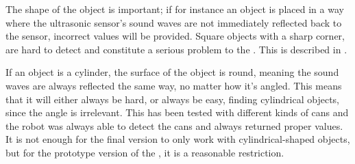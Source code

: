 The shape of the object is important; if for instance an object is placed in a way where the ultrasonic sensor's sound waves are not immediately reflected back to the sensor, incorrect values will be provided. Square objects with a sharp corner, are hard to detect and constitute a serious problem to the \projname{}. This is described in . 

If an object is a cylinder, the surface of the object is round, meaning the sound waves are always reflected the same way, no matter how it's angled. This means that it will either always be hard, or always be easy, finding cylindrical objects, since the angle is irrelevant. This has been tested with different kinds of cans and the robot was always able to detect the cans and always returned proper values. It is not enough for the final version to only work with cylindrical-shaped objects, but for the prototype version of the \projname{}, it is a reasonable restriction.

